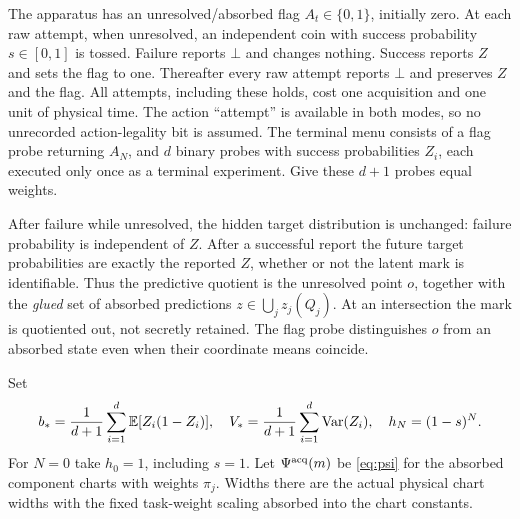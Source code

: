 The apparatus has an unresolved/absorbed flag $A_t\in\{0,1\}$, initially zero. At each raw attempt, when unresolved, an independent coin with success probability $s\in[0,1]$ is tossed. Failure reports $\bot$ and changes nothing. Success reports $Z$ and sets the flag to one. Thereafter every raw attempt reports $\bot$ and preserves $Z$ and the flag. All attempts, including these holds, cost one acquisition and one unit of physical time. The action ``attempt'' is available in both modes, so no unrecorded action-legality bit is assumed. The terminal menu consists of a flag probe returning $A_N$, and $d$ binary probes with success probabilities $Z_i$, each executed only once as a terminal experiment. Give these $d+1$ probes equal weights.

After failure while unresolved, the hidden target distribution is unchanged: failure probability is independent of $Z$. After a successful report the future target probabilities are exactly the reported $Z$, whether or not the latent mark is identifiable. Thus the predictive quotient is the unresolved point $o$, together with the \emph{glued} set of absorbed predictions $z\in\bigcup_jz_j(Q_j)$. At an intersection the mark is quotiented out, not secretly retained. The flag probe distinguishes $o$ from an absorbed state even when their coordinate means coincide.

Set
\begin{equation}\label{eq:sensor-baseline}
 b_* =\frac1{d+1}\sum_{i=1}^d\mathbb E[Z_i(1-Z_i)],\quad
 V_* =\frac1{d+1}\sum_{i=1}^d\operatorname{Var}(Z_i),\quad
 h_N=(1-s)^N.
\end{equation}
For $N=0$ take $h_0=1$, including $s=1$. Let $\Psi^{\rm acq}(m)$ be \eqref{eq:psi} for the absorbed component charts with weights $\pi_j$. Widths there are the actual physical chart widths with the fixed task-weight scaling absorbed into the chart constants.


